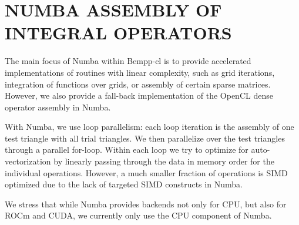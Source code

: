 \section{NUMBA ASSEMBLY OF INTEGRAL OPERATORS}
The main focus of Numba within Bempp-cl is to provide accelerated implementations of routines with linear complexity, such as grid iterations, integration of functions over grids, or assembly of certain sparse matrices. However, we also provide a fall-back implementation of the OpenCL dense operator assembly in Numba.

With Numba, we use loop parallelism: each loop iteration is the assembly of one test triangle with all trial triangles. We then parallelize over the test triangles through a parallel for-loop.
Within each loop we try to optimize for auto-vectorization by linearly passing through the data in memory order for the individual operations. However, a much smaller fraction of operations is SIMD optimized due to the lack of targeted SIMD constructs in Numba.

We stress that while Numba provides backends not only for CPU, but also for ROCm and CUDA, we currently only use the CPU component of Numba.
